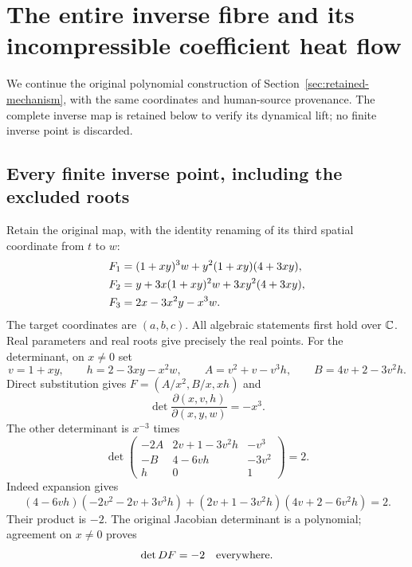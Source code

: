 \section{The entire inverse fibre and its incompressible coefficient heat flow}
\label{sec:inverse-fibre-heat}

We continue the original polynomial construction of
Section~\ref{sec:retained-mechanism}, with the same coordinates and
human-source provenance\cite{tao2026jacobian,speyer2026jacobian,poplett2026alias}.
The complete inverse map is retained below to verify its dynamical lift;
no finite inverse point is discarded.

\subsection{Every finite inverse point, including the excluded roots}

Retain the original map, with the identity renaming of its third spatial
coordinate from $t$ to $w$:
\begin{align}
 F_1&=(1+xy)^3w+y^2(1+xy)(4+3xy),\notag\\
 F_2&=y+3x(1+xy)^2w+3xy^2(4+3xy),\notag\\
 F_3&=2x-3x^2y-x^3w. \label{eq:ifh-original}
\end{align}
The target coordinates are $(a,b,c)$. All algebraic statements first hold
over $\mathbb C$. Real parameters and real roots give precisely the real points.
For the determinant, on $x\ne0$ set
\[
 v=1+xy,\qquad h=2-3xy-x^2w,\qquad
 A=v^2+v-v^3h,\qquad B=4v+2-3v^2h.
\]
Direct substitution gives $F=(A/x^2,B/x,xh)$ and
\[
 \det\frac{\partial(x,v,h)}{\partial(x,y,w)}=-x^3.
\]
The other determinant is $x^{-3}$ times
\[
 \det\begin{pmatrix}
 -2A&2v+1-3v^2h&-v^3\\
 -B&4-6vh&-3v^2\\h&0&1
 \end{pmatrix}=2.
\]
Indeed expansion gives
\[
 (4-6vh)(-2v^2-2v+3v^3h)
 +(2v+1-3v^2h)(4v+2-6v^2h)=2.
\]
Their product is $-2$. The original Jacobian determinant is a polynomial;
agreement on $x\ne0$ proves
\begin{equation}
 \det DF=-2\quad\hbox{everywhere}. \label{eq:ifh-det}
\end{equation}

